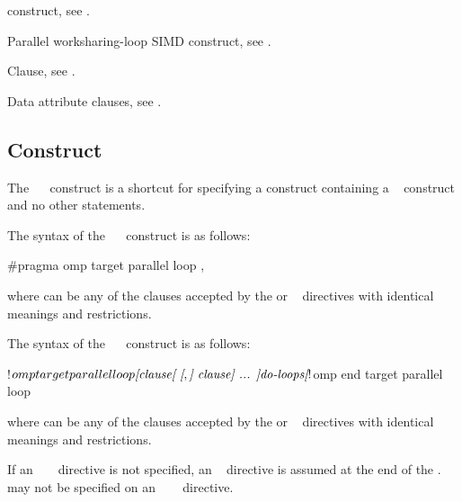 \begin{crossrefs}
\item {} construct, see
.

\item Parallel worksharing-loop SIMD construct, see
.

\item {} Clause, see .

\item Data attribute clauses, see
.
\end{crossrefs}



\subsection{   Construct}
\label{subsec:target parallel loop Construct}
\summary
The ~~ construct is a shortcut for 
specifying a  construct containing a ~ 
construct and no other statements.

\syntax
\begin{ccppspecific}
The syntax of the ~~ construct is as follows:

\begin{ompcPragma}
#pragma omp target parallel loop \plc{[clause[ [},\plc{] clause] ... ] new-line}
\end{ompcPragma}

where  can be any of the clauses accepted by the  
or ~ directives with identical meanings and restrictions.
\end{ccppspecific}

\begin{fortranspecific}
The syntax of the ~~ construct is as follows:

\begin{ompfPragma}
!$omp target parallel loop \plc{[clause[ [},\plc{] clause] ... ]}
    \plc{do-loops}
\plc{[}!$omp end target parallel loop\plc{]}
\end{ompfPragma}

where  can be any of the clauses accepted by the  
or ~ directives with identical meanings and restrictions.

If an ~ ~ directive is not 
specified, an ~   directive 
is assumed at the end of the .  may not be specified 
on an ~~~ directive.
\end{fortranspecific}

